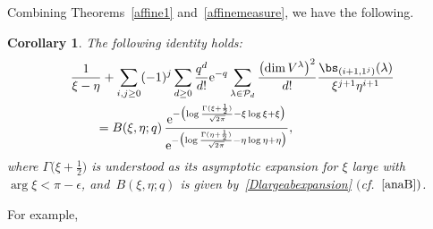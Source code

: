 \documentclass[pdftex]{sigma}
\numberwithin{equation}{section}
\newtheorem{Corollary}[Theorem]{Corollary}
\begin{document}
Combining Theorems~\ref{affine1} and~\ref{affinemeasure}, we have the following.

\begin{Corollary}\label{coridrepele}
The following identity holds:
\begin{align}
&\frac{1}{\xi-\eta} + \sum_{i,j\ge0} (-1)^j \sum_{d\geq 0} \frac{q^d}{d!}{\rm e}^{-q}
\sum_{\lambda \in \mathcal{P}_d} \frac{\bigl(\dim V^\lambda\bigr)^2}{d!} \frac{\bs_{(i+1,1^j)}(\lambda)}{\xi^{j+1} \eta^{i+1}} \nonumber\\
&\qquad{}= B(\xi, \eta;q) \,
\frac
{{\rm e}^{-\bigl(\log \frac{\Gamma(\xi+\frac{1}{2})}{\sqrt{2\pi}} -\xi\log \xi + \xi\bigr)}}
{{\rm e}^{-\bigl(\log \frac{\Gamma(\eta+\frac{1}{2})}{\sqrt{2\pi}} -\eta\log \eta + \eta\bigr)}},\label{id1006}
\end{align}
where $\Gamma\bigl(\xi+\frac{1}{2}\bigr)$ is understood as its asymptotic expansion for $\xi$ large with $\operatorname{arg} \xi <\pi-\epsilon$, and~$B(\xi,\eta;q)$ is given by~\eqref{Dlargeabexpansion} $($cf.\ $\eqref{anaB})$.
\end{Corollary}
For example,
\end{document}
